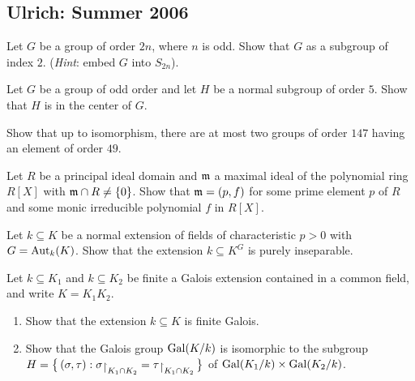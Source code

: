 \subsection{Ulrich: Summer 2006}
\setcounter{exercise}{0}
\setcounter{equation}{0}

\begin{problem}
  Let \(G\) be a group of order \(2n\), where \(n\) is odd. Show that \(G\)
  as a subgroup of index \(2\). (\emph{Hint}: embed \(G\) into
  \(S_{2n}\)).
\end{problem}
\begin{solution}

\end{solution}

\begin{problem}
  Let \(G\) be a group of odd order and let \(H\) be a normal subgroup of
  order \(5\). Show that \(H\) is in the center of \(G\).
\end{problem}
\begin{solution}
\end{solution}

\begin{problem}
  Show that up to isomorphism, there are at most two groups of order
  \(147\) having an element of order \(49\).
\end{problem}
\begin{solution}
\end{solution}

\begin{problem}
  Let \(R\) be a principal ideal domain and \(\mathfrak{m}\) a maximal ideal of
  the polynomial ring \(R[X]\) with \(\mathfrak{m}\cap R\neq \{0\}\). Show that
  \(\mathfrak{m}=(p,f)\) for some prime element \(p\) of \(R\) and some monic
  irreducible polynomial \(f\) in \(R[X]\).
\end{problem}
\begin{solution}
\end{solution}

\begin{problem}
  Let \(k\subseteq K\) be a normal extension of fields of characteristic
  \(p>0\) with \(G=\operatorname{Aut}_k(K)\). Show that the extension \(k\subseteq K^G\)
  is purely inseparable.
\end{problem}
\begin{solution}
\end{solution}

\begin{problem}
  Let \(k\subseteq K_1\) and \(k\subseteq K_2\) be finite a Galois extension
  contained in a common field, and write \(K=K_1K_2\).
  \begin{enumerate}[label=(\alph*)]
  \item Show that the extension \(k\subseteq K\) is finite Galois.
  \item Show that the Galois group \(\operatorname{Gal}(K/k)\) is isomorphic to the
    subgroup
    \(H=\bigl\{\,(\sigma,\tau):\sigma\restrict{K_1\cap
      K_2}=\tau\restrict{K_1\cap K_2}\,\bigr\}\) of
    \(\operatorname{Gal}(K_1/k)\times\operatorname{Gal}(K_2/k)\).
  \end{enumerate}
\end{problem}
\begin{solution}
\end{solution}

